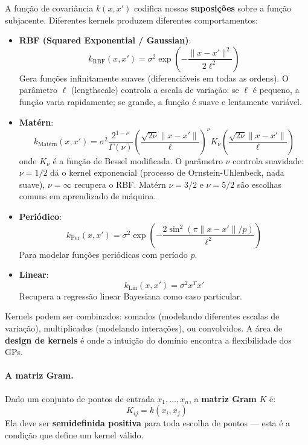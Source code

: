 \documentclass{tufte-handout}
\begin{document}
A função de covariância $k(x, x')$ codifica nossas \textbf{suposições} sobre a função subjacente. Diferentes kernels produzem diferentes comportamentos:

\begin{itemize}
    \item \textbf{RBF (Squared Exponential / Gaussian)}:
    \[
    k_{\text{RBF}}(x, x') = \sigma^2 \exp\!\left(-\frac{\|x - x'\|^2}{2\ell^2}\right)
    \]
    Gera funções infinitamente suaves (diferenciáveis em todas as ordens). O parâmetro $\ell$ (lengthscale) controla a escala de variação: se $\ell$ é pequeno, a função varia rapidamente; se grande, a função é suave e lentamente variável.
    
    \item \textbf{Matérn}:
    \[
    k_{\text{Matérn}}(x, x') = \sigma^2 \frac{2^{1-\nu}}{\Gamma(\nu)} \left(\frac{\sqrt{2\nu}\|x-x'\|}{\ell}\right)^\nu K_\nu\!\left(\frac{\sqrt{2\nu}\|x-x'\|}{\ell}\right)
    \]
    onde $K_\nu$ é a função de Bessel modificada. O parâmetro $\nu$ controla suavidade: $\nu = 1/2$ dá o kernel exponencial (processo de Ornstein-Uhlenbeck, nada suave), $\nu = \infty$ recupera o RBF. Matérn $\nu = 3/2$ e $\nu = 5/2$ são escolhas comuns em aprendizado de máquina.
    
    \item \textbf{Periódico}:
    \[
    k_{\text{Per}}(x, x') = \sigma^2 \exp\!\left(-\frac{2\sin^2(\pi\|x-x'\|/p)}{\ell^2}\right)
    \]
    Para modelar funções periódicas com período $p$.
    
    \item \textbf{Linear}:
    \[
    k_{\text{Lin}}(x, x') = \sigma^2 x^T x'
    \]
    Recupera a regressão linear Bayesiana como caso particular.
\end{itemize}

\begin{remark}
    Kernels podem ser combinados: somados (modelando diferentes escalas de variação), multiplicados (modelando interações), ou convolvidos. A área de \textbf{design de kernels} é onde a intuição do domínio encontra a flexibilidade dos GPs.
\end{remark}

\paragraph{A matriz Gram.}

Dado um conjunto de pontos de entrada $x_1, \dots, x_n$, a \textbf{matriz Gram} $K$ é:
\[
K_{ij} = k(x_i, x_j)
\]
Ela deve ser \textbf{semidefinida positiva} para toda escolha de pontos --- esta é a condição que define um kernel válido.
\end{document}
